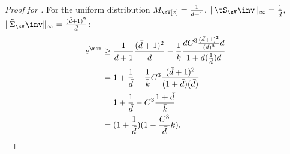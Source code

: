 \begin{proof}[Proof for ]
  For the uniform distribution $M_\sV[x] = \frac{1}{\bar d + 1}$,
  $\|\tS_\sV\inv\|_\infty = \frac{1}{\bar d}$, $\|\tilde
  \Sigma_\sV\inv\|_\infty = \frac{(\bar d + 1)^2}{\bar d}$:
  \begin{align*}
    e^\mom 
    &\ge \frac{1}{\bar d + 1} \frac{(\bar d + 1)^2}{\bar d} 
    - \frac{1}{\bar k} \frac{{\bar d} C^3 \frac{(\bar d + 1)^2}{(\bar d)^3} {\bar d}}
    {1 + {\bar d} (\frac{1}{\bar d}) {\bar d}} \\
    &= 1 + \frac{1}{\bar d} - \frac{1}{\bar k} C^3 \frac{(\bar d+1)^2}{(1+ \bar d)(\bar d)} \\
    &= 1 + \frac{1}{\bar d} - C^3 \frac{1+\bar d}{\bar k} \\
    &= (1 + \frac{1}{\bar d}) (1 - \frac{C^3}{\bar d}{\bar k}).
  \end{align*}
   
\end{proof}

